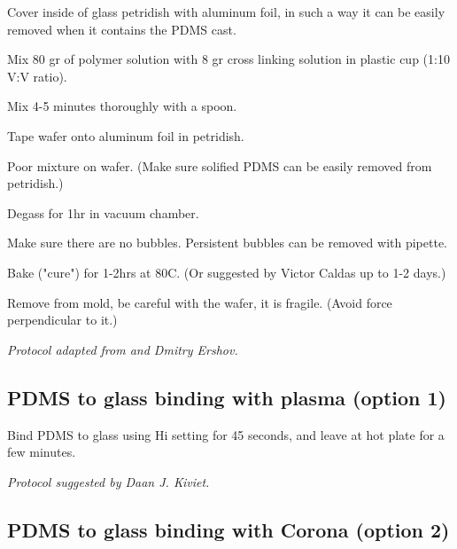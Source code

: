 \begin{compactitem}
    \item Cover inside of glass petridish with aluminum foil, in such a way it can be easily removed when it contains the PDMS cast.
    \item Mix 80 gr of polymer solution with 8 gr cross linking solution in plastic cup (1:10 V:V ratio).
    \item Mix 4-5 minutes thoroughly with a spoon.
    \item Tape wafer onto aluminum foil in petridish. 
    \item Poor mixture on wafer. (Make sure solified PDMS can be easily removed from petridish.)
    \item Degass for 1hr in vacuum chamber.
    \item Make sure there are no bubbles. Persistent bubbles can be removed with pipette.
    \item Bake ("cure") for 1-2hrs at 80C. (Or suggested by Victor Caldas up to 1-2 days.)
    \item Remove from mold, be careful with the wafer, it is fragile. (Avoid force perpendicular to it.)
\end{compactitem}

\hfill \textit{Protocol adapted from \cite{Boulineau2013} and Dmitry Ershov.}    
    
\newpage    
    
    
\subsection*{PDMS to glass binding with plasma (option 1)}    

\begin{compactitem}
    \item Bind PDMS to glass using Hi setting for 45 seconds, and leave at hot plate for a few minutes.
\end{compactitem}

\hfill \textit{Protocol suggested by Daan J. Kiviet.}


\subsection*{PDMS to glass binding with Corona (option 2)}    

